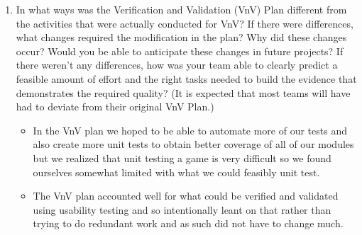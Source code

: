 \documentclass[12pt, titlepage]{article}
\begin{document}
\begin{enumerate}
  \item In what ways was the Verification and Validation (VnV) Plan different
  from the activities that were actually conducted for VnV?  If there were
  differences, what changes required the modification in the plan?  Why did
  these changes occur?  Would you be able to anticipate these changes in future
  projects?  If there weren't any differences, how was your team able to clearly
  predict a feasible amount of effort and the right tasks needed to build the
  evidence that demonstrates the required quality?  (It is expected that most
  teams will have had to deviate from their original VnV Plan.)
  
\begin{itemize}
  \item In the VnV plan we hoped to be able to automate more of our tests and also create more unit tests to obtain better coverage of all of our modules but we realized that unit testing a game is very difficult so we found ourselves somewhat limited with what we could feasibly unit test. 
  \item The VnV plan accounted well for what could be verified and validated using usability testing and so intentionally leant on that rather than trying to do redundant work and as such did not have to change much.
\end{itemize}
  
\end{enumerate}
\end{document}
